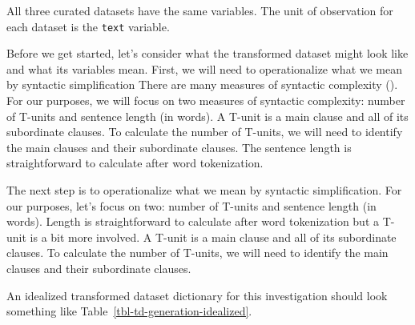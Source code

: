 \documentclass[
  letterpaper,
]{latex/krantz}
\theoremstyle{definition}
\theoremstyle{remark}
\begin{document}
All three curated datasets have the same variables. The unit of
observation for each dataset is the \texttt{text} variable.

Before we get started, let's consider what the transformed dataset might
look like and what its variables mean. First, we will need to
operationalize what we mean by syntactic simplification There are many
measures of syntactic complexity
(). For our purposes, we
will focus on two measures of syntactic complexity: number of T-units
and sentence length (in words). A T-unit is a main clause and all of its
subordinate clauses. To calculate the number of T-units, we will need to
identify the main clauses and their subordinate clauses. The sentence
length is straightforward to calculate after word tokenization.

The next step is to operationalize what we mean by syntactic
simplification. For our purposes, let's focus on two: number of T-units
and sentence length (in words). Length is straightforward to calculate
after word tokenization but a T-unit is a bit more involved. A T-unit is
a main clause and all of its subordinate clauses. To calculate the
number of T-units, we will need to identify the main clauses and their
subordinate clauses.

An idealized transformed dataset dictionary for this investigation
should look something like Table~\ref{tbl-td-generation-idealized}.
\end{document}
